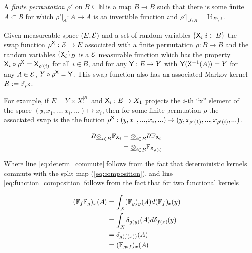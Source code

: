 \begin{definition}\label{def:permut_swap}
A \emph{finite permutation} $\rho'$ on $B\subseteq\mathbb{N}$ is a map $B\to B$ such that there is some finite $A\subset B$ for which $\rho'|_A:A\to A$ is an invertible function and $\rho'|_{B\setminus A} = \mathrm{Id}_{B\setminus A}$.

Given measureable space $(E,\mathcal{E})$ and a set of random variables $\{\mathsf{X}_i|i\in B\}$ the swap function $\rho^{\mathsf{X}}:E\to E$ associated with a finite permutation $\rho:B\to B$ and the random variables $\{\mathsf{X}_i\}_B$ is a $\mathcal{E}$ measurable function which has the property $\mathsf{X}_i\circ \rho^{\mathsf{X}}=\mathsf{X}_{\rho'(i)} $ for all $i\in B$, and for any $\mathsf{Y}:E\to Y$ with $\mathsf{Y}(\mathsf{X}^{-1}(A))=Y$ for any $A\in \mathcal{E}$, $Y\circ\rho^{\mathsf{X}}=\mathsf{Y}$. This swap function also has an associated Markov kernel $R:=\mathbb{F}_{\rho^{\mathsf{X}}}$.

For example, if $E = Y\times X_1^{|B|}$ and $\mathsf{X}_i:E\to X_1$ projects the $i$-th ``x'' element of the space $(y,x_1,...,x_i,...)\mapsto x_i$, then for some finite permuation $\rho$ the associated swap is the the fuction $\rho^{\mathsf{X}}:(y,x_1,...,x_i,...)\mapsto (y,x_{\rho'(1)},...,x_{\rho'(i)},...)$.
\end{definition}

\begin{align}
    R \underline{\otimes}_{i\in B} \mathbb{F}_{\mathsf{X}_i} &= \underline{\otimes}_{i\in B} R \mathbb{F}_{\mathsf{X}_{i}}\label{eq:determ_commute}\\
                                               &= \underline{\otimes}_{i\in B} \mathbb{F}_{\mathsf{X}_{\rho(i)}}\label{eq:function_composition}
\end{align}

Where line \ref{eq:determ_commute} follows from the fact that deterministic kernels commute with the split map (\ref{eq:composition}), and line \ref{eq:function_composition} follows from the fact that for two functional kernels 

\begin{align}
    (\mathbb{F}_{f}\mathbb{F}_g)_x(A) &= \int_X (\mathbb{F}_g)_y(A) d(\mathbb{F}_f)_x(y)\\
                                      &= \int_X \delta_{g(y)}(A) d\delta_{f(x)}(y)\\
                                      &= \delta_{g(f(x))} (A)\\
                                      &= (\mathbb{F}_{g\circ f})_x(A) 
\end{align}


